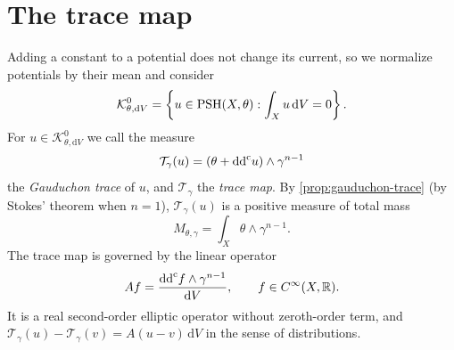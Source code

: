 \section{The trace map}
\label{sec:gauduchon-trace-topology}

Adding a constant to a potential does not change its current, so we normalize potentials by their mean and consider
\[
 \mathcal K^0_{\theta,\mathrm{d}V}
   =\left\{u\in\mathrm{PSH}(X,\theta):\int_Xu\,\mathrm{d}V=0\right\}.
\]
For $u\in\mathcal K^0_{\theta,\mathrm{d}V}$ we call the measure
\[
 \mathcal T_\gamma(u)
     =(\theta+\mathrm{dd}^{\mathrm{c}} u)\wedge\gamma^{n-1}
\]
the \emph{Gauduchon trace} of $u$, and $\mathcal T_\gamma$ the \emph{trace map}. By \cref{prop:gauduchon-trace} (by Stokes' theorem when $n=1$), $\mathcal T_\gamma(u)$ is a positive measure of total mass
\[
 M_{\theta,\gamma}=\int_X\theta\wedge\gamma^{n-1}.
\]
The trace map is governed by the linear operator
\[
 Af=\frac{\mathrm{dd}^{\mathrm{c}} f\wedge\gamma^{n-1}}{\mathrm{d}V},\qquad f\in C^\infty(X,\mathbb R).
\]
It is a real second-order elliptic operator without zeroth-order term, and $\mathcal T_\gamma(u)-\mathcal T_\gamma(v)=A(u-v)\,\mathrm{d}V$ in the sense of distributions.

